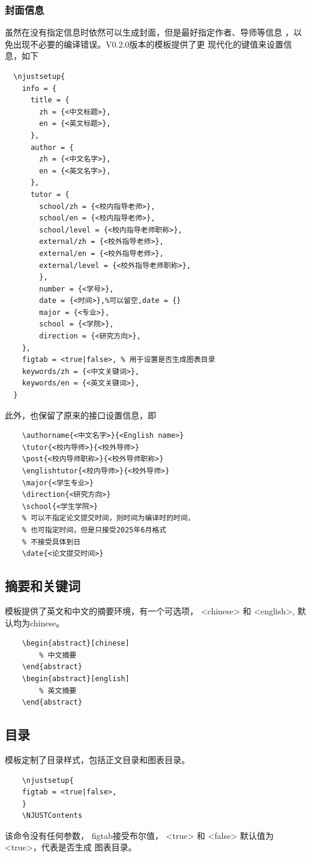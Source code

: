 \subsubsection{封面信息}
虽然在没有指定信息时依然可以生成封面，但是最好指定作者、导师等信息
，以免出现不必要的编译错误。{\ttfamily V0.2.0}版本的模板提供了更
现代化的键值来设置信息，如下
\begin{lstlisting}
  \njustsetup{
    info = {
      title = {
        zh = {<中文标题>},
        en = {<英文标题>},
      },
      author = {
        zh = {<中文名字>},
        en = {<英文名字>},
      },
      tutor = {
        school/zh = {<校内指导老师>},
        school/en = {<校内指导老师>},
        school/level = {<校内指导老师职称>},
        external/zh = {<校外指导老师>},
        external/en = {<校外指导老师>},
        external/level = {<校外指导老师职称>},
        },
        number = {<学号>},
        date = {<时间>},%可以留空,date = {}
        major = {<专业>},
        school = {<学院>},
        direction = {<研究方向>},
    },
    figtab = <true|false>, % 用于设置是否生成图表目录
    keywords/zh = {<中文关键词>},
    keywords/en = {<英文关键词>},
  }
\end{lstlisting}

此外，也保留了原来的接口设置信息，即
\begin{lstlisting}
    \authorname{<中文名字>}{<English name>}
    \tutor{<校内导师>}{<校外导师>}
    \post{<校内导师职称>}{<校外导师职称>}
    \englishtutor{<校内导师>}{<校外导师>}
    \major{<学生专业>}
    \direction{<研究方向>}
    \school{<学生学院>}
    % 可以不指定论文提交时间，则时间为编译时的时间，
    % 也可指定时间，但是只接受2025年6月格式
    % 不接受具体到日
    \date{<论文提交时间>}
\end{lstlisting}

\subsection{摘要和关键词}
模板提供了英文和中文的摘要环境，有一个可选项，
{\ttfamily <chinese>} 和 {\ttfamily <english>},
默认均为{\ttfamily chinese}。
\begin{lstlisting}
    \begin{abstract}[chinese]
        % 中文摘要
    \end{abstract}
    \begin{abstract}[english]
        % 英文摘要
    \end{abstract}
\end{lstlisting}


\subsection{目录}
模板定制了目录样式，包括正文目录和图表目录。
\begin{lstlisting}
    \njustsetup{
    figtab = <true|false>,
    }
    \NJUSTContents
\end{lstlisting}
该命令没有任何参数，
{\ttfamily figtab}接受布尔值，
{\ttfamily <true>} 和 {\ttfamily <false>}
默认值为{\ttfamily <true>}，代表是否生成
图表目录。

